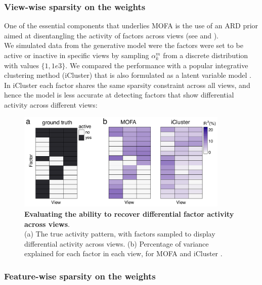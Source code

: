 \subsubsection{View-wise sparsity on the weights}

One of the essential components that underlies MOFA is the use of an ARD prior aimed at disentangling the activity of factors across views (see  and ).\\
We simulated data from the generative model were the factors were set to be active or inactive in specific views by sampling $\alpha_{k}^{m}$ from a discrete distribution with values $\{ 1, 1e3\}$. We compared the performance with a popular integrative clustering method (iCluster) that is also formulated as a latent variable model \cite{Mo2013}. In iCluster each factor shares the same sparsity constraint across all views, and hence the model is less accurate at detecting factors that show differential activity across different views:

\begin{figure}[H]
	\centering 	
	\includegraphics[width=0.9\textwidth]{MOFA_group_sparsity}
	\caption{\textbf{Evaluating the ability to recover differential factor activity across views}.\\
	(a) The true activity pattern, with factors sampled to display differential activity across views.
	(b) Percentage of variance explained for each factor in each view, for MOFA and iCluster \cite{Mo2013}.}
	\label{fig:MOFA_group_sparsity}
\end{figure}

\subsubsection{Feature-wise sparsity on the weights} \label{section:spike_slab}


